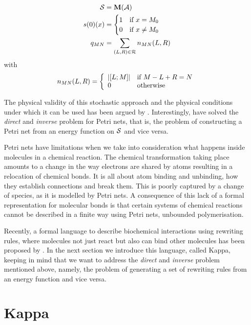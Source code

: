 \begin{align*}
  \mathcal{S} &{} = \mathbf{M}(\mathcal{A}) \\
  s(0)(x) &{} = \begin{cases}
    1 \quad\text{if } x = M_0 \\
    0 \quad\text{if } x \neq M_0
  \end{cases} \\
  q_{MN} &{} = \sum_{\left(L,R\right) \in \mathcal{R}} n_{MN}(L,R)
\end{align*}
with
\begin{equation*}
  n_{MN}(L,R) = \left\{\begin{array}{ll}
    \left\lvert \left[L;M\right] \right\rvert & \text{if } M - L + R = N \\
    0 & \text{otherwise}
  \end{array}\right.
\end{equation*}

The physical validity of this stochastic approach
and the physical conditions under which
it can be used has been argued by \citet{gillespie76}.
Interestingly, \citet{et2} have solved
the \emph{direct} and \emph{inverse} problem for Petri nets,
that is, the problem of constructing a Petri net
from an energy function on $\mathcal{S}$ and vice versa.

Petri nets have limitations when we take into consideration
what happens inside molecules in a chemical reaction.
The chemical transformation taking place amounts to
a change in the way electrons are shared by atoms
resulting in a relocation of chemical bonds.
It is all about atom binding and unbinding,
\ie how they establish connections and break them.
This is poorly captured by a change of species,
as it is modelled by Petri nets.
A consequence of this lack of a formal representation for
molecular bonds is that certain systems of chemical reactions
cannot be described in a finite way using Petri nets,
\eg unbounded polymerisation.

Recently,
a formal language to describe biochemical interactions
using rewriting rules,
where molecules not just react but also can bind other molecules
has been proposed by \citet{danoslaneve2002a}.
In the next section we introduce this language, called Kappa,
keeping in mind that we want to address
the \emph{direct} and \emph{inverse} problem mentioned above,
namely, the problem of generating a set of rewriting rules
from an energy function and vice versa.


\section{Kappa}

















